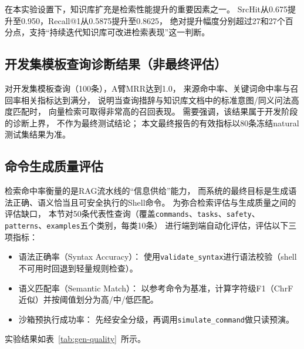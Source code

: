 在本实验设置下，知识库扩充是检索性能提升的重要因素之一。
SrcHit从0.675提升至0.950，Recall@1从0.5875提升至0.8625，
绝对提升幅度分别超过27和27个百分点，支持“持续迭代知识库可改进检索表现”这一判断。

\subsection{开发集模板查询诊断结果（非最终评估）}

对开发集模板查询（100条），A臂MRR达到1.0，
来源命中率、关键词命中率与召回率相关指标达到满分，
说明当查询措辞与知识库文档中的标准意图/同义问法高度匹配时，
向量检索可取得非常高的召回表现。
需要强调，该结果属于开发阶段的诊断上界，
不作为最终测试结论；
本文最终报告的有效指标以80条冻结natural测试集结果为准。

\subsection{命令生成质量评估}
\label{subsec:gen-quality}

检索命中率衡量的是RAG流水线的“信息供给”能力，
而系统的最终目标是生成语法正确、语义恰当且可安全执行的Shell命令。
为弥合检索评估与生成质量之间的评估缺口，
本节对50条代表性查询（覆盖\texttt{commands}、\texttt{tasks}、\texttt{safety}、
\texttt{patterns}、\texttt{examples}五个类别，每类10条）
进行端到端自动化评估，评估以下三项指标：

\begin{itemize}
    \item 语法正确率（Syntax Accuracy）：
        使用\texttt{validate\_syntax}进行语法校验（shell不可用时回退到轻量规则检查）。
    \item 语义匹配率（Semantic Match）：
        以参考命令为基准，计算字符级F1（ChrF近似）并按阈值划分为高/中/低匹配。
    \item 沙箱预执行成功率：
        先经安全分级，再调用\texttt{simulate\_command}做只读预演。
\end{itemize}

实验结果如表~\ref{tab:gen-quality}~所示。

